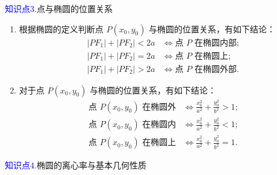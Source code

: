 \documentclass{article}
\begin{document}
\;\;\;\;\textcolor{blue}{知识点3.}点与椭圆的位置关系
\vspace{1\baselineskip}

\begin{enumerate}
    \item 根据椭圆的定义判断点 \( P(x_0, y_0) \) 与椭圆的位置关系，有如下结论：
        \[
        \begin{aligned}
        |PF_1| + |PF_2| < 2a &\iff \text{点 } P \text{ 在椭圆内部}; \\
        |PF_1| + |PF_2| = 2a &\iff \text{点 } P \text{ 在椭圆上}; \\
        |PF_1| + |PF_2| > 2a &\iff \text{点 } P \text{ 在椭圆外部}.
        \end{aligned}
        \]
    \item 对于点 \( P(x_0, y_0) \) 与椭圆的位置关系，有如下结论：
        \[
        \begin{aligned}
        \text{点 } P(x_0, y_0) \text{ 在椭圆外} &\iff \frac{x_0^2}{a^2} + \frac{y_0^2}{b^2} > 1; \\
        \text{点 } P(x_0, y_0) \text{ 在椭圆内} &\iff \frac{x_0^2}{a^2} + \frac{y_0^2}{b^2} < 1; \\
        \text{点 } P(x_0, y_0) \text{ 在椭圆上} &\iff \frac{x_0^2}{a^2} + \frac{y_0^2}{b^2} = 1.
        \end{aligned}
        \]
\end{enumerate}
\vspace{1\baselineskip}

\;\;\;\;\textcolor{blue}{知识点4.}椭圆的离心率与基本几何性质
\vspace{1\baselineskip}
\end{document}
